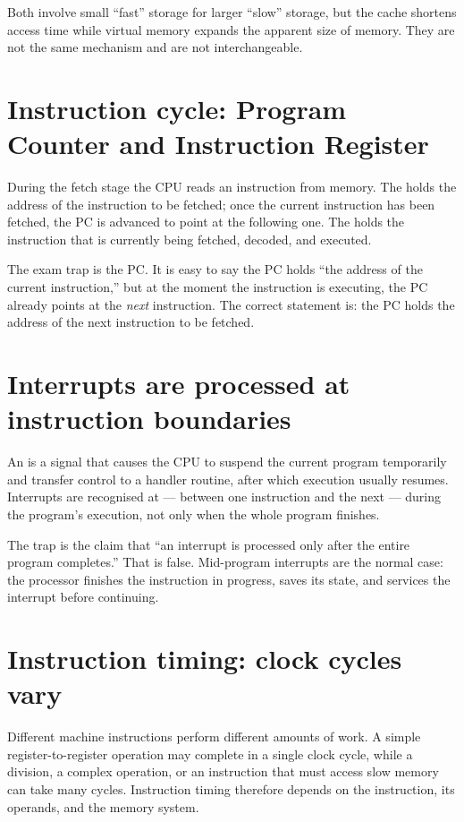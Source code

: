 Both involve small ``fast'' storage for larger ``slow'' storage, but the cache
shortens access time while virtual memory expands the apparent size of memory.
They are not the same mechanism and are not interchangeable.

\section{Instruction cycle: Program Counter and Instruction Register}
During the fetch stage the CPU reads an instruction from memory. The
 holds the address of the  instruction to
be fetched; once the current instruction has been fetched, the PC is advanced
to point at the following one. The  holds the
instruction that is currently being fetched, decoded, and executed.

The exam trap is the PC. It is easy to say the PC holds ``the address of the
current instruction,'' but at the moment the instruction is executing, the PC
already points at the \emph{next} instruction. The correct statement is: the
PC holds the address of the next instruction to be fetched.

\section{Interrupts are processed at instruction boundaries}
An  is a signal that causes the CPU to suspend the current
program temporarily and transfer control to a handler routine, after which
execution usually resumes. Interrupts are recognised at  --- between one instruction and the next --- during the program's
execution, not only when the whole program finishes.

The trap is the claim that ``an interrupt is processed only after the entire
program completes.'' That is false. Mid-program interrupts are the normal
case: the processor finishes the instruction in progress, saves its state, and
services the interrupt before continuing.

\section{Instruction timing: clock cycles vary}
Different machine instructions perform different amounts of work. A simple
register-to-register operation may complete in a single clock cycle, while a
division, a complex operation, or an instruction that must access slow memory
can take many cycles. Instruction timing therefore depends on the
instruction, its operands, and the memory system.

